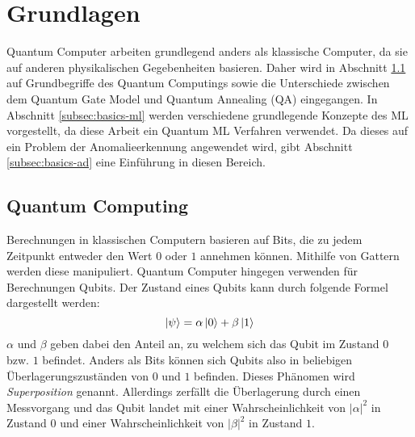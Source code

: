 \section{Grundlagen}
\label{sec:basics}
Quantum Computer arbeiten grundlegend anders als klassische Computer, da sie auf anderen physikalischen Gegebenheiten basieren. Daher wird in Abschnitt \ref{subsec:basics-qc} auf Grundbegriffe des Quantum Computings sowie die Unterschiede zwischen dem Quantum Gate Model und Quantum Annealing (QA) eingegangen. In Abschnitt \ref{subsec:basics-ml} werden verschiedene grundlegende Konzepte des ML vorgestellt, da diese Arbeit ein Quantum ML Verfahren verwendet. Da dieses auf ein Problem der Anomalieerkennung angewendet wird, gibt Abschnitt \ref{subsec:basics-ad} eine Einführung in diesen Bereich.

\subsection{Quantum Computing}
\label{subsec:basics-qc}
Berechnungen in klassischen Computern basieren auf Bits, die zu jedem Zeitpunkt entweder den Wert $0$ oder $1$ annehmen können. Mithilfe von Gattern werden diese manipuliert. Quantum Computer hingegen verwenden für Berechnungen Qubits. Der Zustand eines Qubits kann durch folgende Formel dargestellt werden:
\begin{equation}
    \ket{\psi} = \alpha\ket{0} + \beta\ket{1}
\end{equation}
$\alpha$ und $\beta$ geben dabei den Anteil an, zu welchem sich das Qubit im Zustand $0$ bzw. $1$ befindet. Anders als Bits können sich Qubits also in beliebigen Überlagerungszuständen von $0$ und $1$ befinden. Dieses Phänomen wird \emph{Superposition} genannt. Allerdings zerfällt die Überlagerung durch einen Messvorgang und das Qubit landet mit einer Wahrscheinlichkeit von $|\alpha|^2$ in Zustand $0$ und einer Wahrscheinlichkeit von $|\beta|^2$ in Zustand $1$. \cite{qc-homeister}
\\\\
